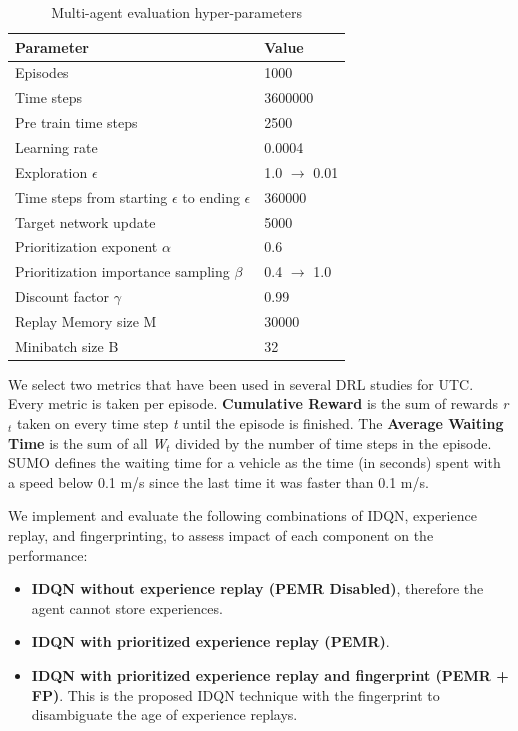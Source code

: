 \documentclass{llncs}
\begin{document}
\begin{table}
\centering
\caption{Multi-agent evaluation hyper-parameters}
 \begin{tabularx}{\columnwidth}{X|X}
 \hline
 Parameter & Value \\ [0.5ex] 
 \hline
 \hline
 Episodes & 1000 \\
 Time steps & 3600000 \\
 Pre train time steps & 2500 \\
 Learning rate & 0.0004 \\
 Exploration $\epsilon$ & 1.0 $\rightarrow$ 0.01 \\
 Time steps from starting $\epsilon$ to ending $\epsilon$ & 360000 \\
 Target network update & 5000 \\
 Prioritization exponent $\alpha$ & 0.6 \\
 Prioritization importance sampling $\beta$ & 0.4 $\rightarrow$ 1.0 \\
 Discount factor $\gamma$ & 0.99 \\
 Replay Memory size M & 30000 \\
 Minibatch size B & 32 \\
 \hline
\end{tabularx}
\label{tab:MARLhyp}
\end{table}

We select two metrics that have been used in several DRL studies for UTC. Every metric is taken per episode. \textbf{Cumulative Reward} is the sum of rewards \textit{r$_{t}$} taken on every time step \textit{t} until the episode is finished. The \textbf{Average Waiting Time} is the sum of all \textit{W$_{t}$} divided by the number of time steps in the episode. SUMO defines the waiting time for a vehicle as the time (in seconds) spent with a speed below 0.1 m/s since the last time it was faster than 0.1 m/s.

We implement and evaluate the following combinations of IDQN, experience replay, and fingerprinting, to assess impact of each component on the performance:

\begin{itemize}
\item \textbf{IDQN without experience replay (PEMR Disabled)}, therefore the agent cannot store experiences.
\item \textbf{IDQN with prioritized experience replay (PEMR)}. 
\item \textbf{IDQN with prioritized experience replay and fingerprint (PEMR + FP)}. This is the proposed IDQN technique with the fingerprint to disambiguate the age of experience replays.
\end{itemize}
\end{document}
